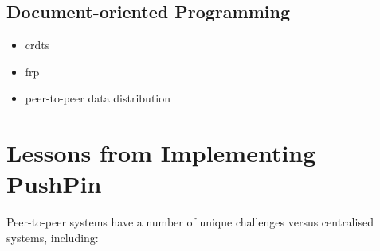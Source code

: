 \documentclass[sigplan,10pt]{acmart}
\begin{document}



\subsection{Document-oriented Programming}
\begin{itemize}
    \item crdts
    \item frp
    \item peer-to-peer data distribution
\end{itemize}

\section{Lessons from Implementing PushPin}\label{sec:lessons}


Peer-to-peer systems have a number of unique challenges versus centralised systems, including:
\end{document}
